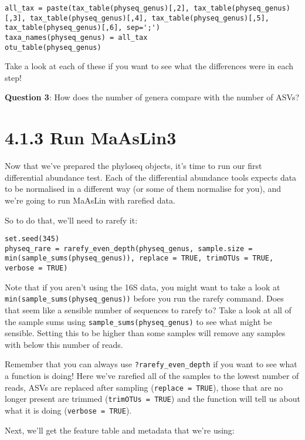 \documentclass[
]{book}
\begin{document}
\begin{verbatim}
all_tax = paste(tax_table(physeq_genus)[,2], tax_table(physeq_genus)[,3], tax_table(physeq_genus)[,4], tax_table(physeq_genus)[,5], tax_table(physeq_genus)[,6], sep=';')
taxa_names(physeq_genus) = all_tax
otu_table(physeq_genus)
\end{verbatim}

Take a look at each of these if you want to see what the differences were in each step!

\textbf{Question 3}: How does the number of genera compare with the number of ASVs?

\section{4.1.3 Run MaAsLin3}\label{run-maaslin3}

Now that we've prepared the phyloseq objects, it's time to run our first differential abundance test. Each of the differential abundance tools expects data to be normalised in a different way (or some of them normalise for you), and we're going to run MaAsLin with rarefied data.

So to do that, we'll need to rarefy it:

\begin{verbatim}
set.seed(345)
physeq_rare = rarefy_even_depth(physeq_genus, sample.size = min(sample_sums(physeq_genus)), replace = TRUE, trimOTUs = TRUE, verbose = TRUE)
\end{verbatim}

Note that if you aren't using the 16S data, you might want to take a look at \texttt{min(sample\_sums(physeq\_genus))} before you run the rarefy command. Does that seem like a sensible number of sequences to rarefy to? Take a look at all of the sample sums using \texttt{sample\_sums(physeq\_genus)} to see what might be sensible. Setting this to be higher than some samples will remove any samples with below this number of reads.

Remember that you can always use \texttt{?rarefy\_even\_depth} if you want to see what a function is doing!
Here we've rarefied all of the samples to the lowest number of reads, ASVs are replaced after sampling (\texttt{replace\ =\ TRUE}), those that are no longer present are trimmed (\texttt{trimOTUs\ =\ TRUE}) and the function will tell us about what it is doing (\texttt{verbose\ =\ TRUE}).

Next, we'll get the feature table and metadata that we're using:
\end{document}
